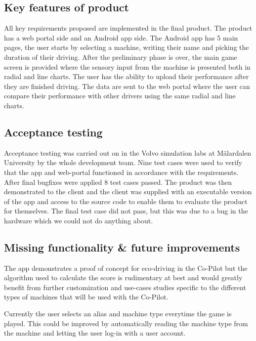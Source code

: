 \documentclass{article}
\begin{document}
\subsection{Key features of product}

All key requirements proposed are implemented in the final product. The product has a web portal side and an Android app side. The Android app has 5 main pages, the user starts by selecting a machine, writing their name and picking the duration of their driving. After the preliminary phase is over, the main game screen is provided where the sensory input from the machine is presented both in  radial and line charts. The user has the ability to upload their performance after they are finished driving. The data are sent to the web portal where the user can compare their performance with other drivers using the same radial and line charts. 

\subsection{Acceptance testing}

Acceptance testing was carried out on in the Volvo simulation labs at Mälardalen University by the whole development team. Nine test cases were used to verify that the app and web-portal functioned in accordance with the requirements. After final bugfixes were applied 8 test cases passed. The product was then demonstrated to the client and the client was supplied with an executable version of the app and access to the source code to enable them to evaluate the product for themselves. The final test case did not pass, but this was due to a bug in the hardware which we could not do anything about.

\subsection{Missing functionality \& future improvements}

The app demonstrates a proof of concept for eco-driving in the Co-Pilot but the algorithm used to calculate the score is rudimentary at best and would greatly benefit from further customization and use-cases studies specific to the different types of machines that will be used with the Co-Pilot.

Currently the user selects an alias and machine type everytime the game is played. This could be improved by automatically reading the machine type from the machine and letting the user log-in with a user account.
\end{document}
